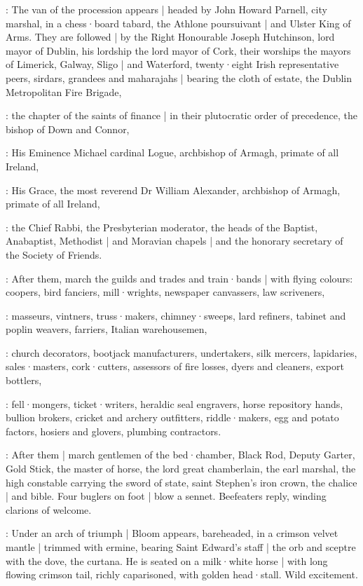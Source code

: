 :
The van of the procession appears |
headed by John Howard Parnell,
city marshal,
in a chess·board tabard,
the Athlone poursuivant |
and Ulster King of Arms.
They are followed |
by the Right Honourable Joseph Hutchinson,
lord mayor of Dublin,
his lordship the lord mayor of Cork,
their worships the mayors of Limerick,
Galway,
Sligo |
and Waterford,
twenty·eight Irish representative peers,
sirdars,
grandees and maharajahs |
bearing the cloth of estate,
the Dublin Metropolitan Fire Brigade,

:
the chapter of the saints of finance |
in their plutocratic order of precedence,
the bishop of Down and Connor,

:
His Eminence Michael cardinal Logue,
archbishop of Armagh,
primate of all Ireland,

:
His Grace,
the most reverend Dr William Alexander,
archbishop of Armagh,
primate of all Ireland,

:
the Chief Rabbi,
the Presbyterian moderator,
the heads of the Baptist,
Anabaptist,
Methodist |
and Moravian chapels |
and the honorary secretary of the Society of Friends.

:
After them,
march the guilds and trades and train·bands |
with flying colours:
coopers,
bird fanciers,
mill·wrights,
newspaper canvassers,
law scriveners,

:
masseurs,
vintners,
truss·makers,
chimney·sweeps,
lard refiners,
tabinet and poplin weavers,
farriers,
Italian warehousemen,

:
church decorators,
bootjack manufacturers,
undertakers,
silk mercers,
lapidaries,
sales·masters,
cork·cutters,
assessors of fire losses,
dyers and cleaners,
export bottlers,

:
fell·mongers,
ticket·writers,
heraldic seal engravers,
horse repository hands,
bullion brokers,
cricket and archery outfitters,
riddle·makers,
egg and potato factors,
hosiers and glovers,
plumbing contractors.

:
After them |
march gentlemen of the bed·chamber,
Black Rod,
Deputy Garter,
Gold Stick,
the master of horse,
the lord great chamberlain,
the earl marshal,
the high constable carrying the sword of state,
saint Stephen's iron crown,
the chalice |
and bible.
Four buglers on foot |
blow a sennet.
Beefeaters reply,
winding clarions of welcome.

:
Under an arch of triumph |
Bloom appears,
bareheaded,
in a crimson velvet mantle |
trimmed with ermine,
bearing Saint Edward's staff |
the orb and sceptre with the dove,
the curtana.
He is seated on a milk·white horse |
with long flowing crimson tail,
richly caparisoned,
with golden head·stall.
Wild excitement.

